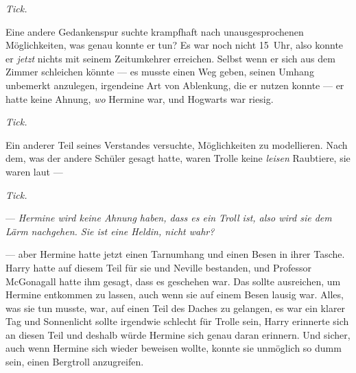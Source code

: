 \emph{Tick.}

Eine andere Gedankenspur suchte krampfhaft nach unausgesprochenen Möglichkeiten, was genau konnte er tun? Es war noch nicht 15~Uhr, also konnte er \emph{jetzt} nichts mit seinem Zeitumkehrer erreichen. Selbst wenn er sich aus dem Zimmer schleichen könnte — es musste einen Weg geben, seinen Umhang unbemerkt anzulegen, irgendeine Art von Ablenkung, die er nutzen konnte — er hatte keine Ahnung, \emph{wo} Hermine war, und Hogwarts war riesig.

\emph{Tick.}

Ein anderer Teil seines Verstandes versuchte, Möglichkeiten zu modellieren. Nach dem, was der andere Schüler gesagt hatte, waren Trolle keine \emph{leisen} Raubtiere, sie waren laut —

\emph{Tick.}


— \emph{Hermine wird keine Ahnung haben, dass es ein Troll ist, also wird sie dem Lärm nachgehen. Sie ist eine Heldin, nicht wahr?}

— aber Hermine hatte jetzt einen Tarnumhang und einen Besen in ihrer Tasche. Harry hatte auf diesem Teil für sie und Neville bestanden, und Professor McGonagall hatte ihm gesagt, dass es geschehen war. Das sollte ausreichen, um Hermine entkommen zu lassen, auch wenn sie auf einem Besen lausig war. Alles, was sie tun musste, war, auf einen Teil des Daches zu gelangen, es war ein klarer Tag und Sonnenlicht sollte irgendwie schlecht für Trolle sein, Harry erinnerte sich an diesen Teil und deshalb würde Hermine sich genau daran erinnern. Und sicher, auch wenn Hermine sich wieder beweisen wollte, konnte sie unmöglich so dumm sein, einen Bergtroll anzugreifen.

